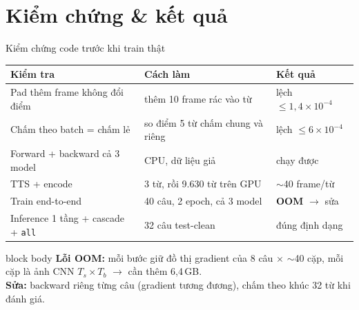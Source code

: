 \documentclass[aspectratio=169,xcolor=table]{beamer}
\newcommand{\bad}[1]{\textcolor{RiskRed}{\textbf{#1}}}
\newcommand{\cmark}{\textcolor{GoodGreen}{\ding{51}}}
\begin{document}
\section{Kiểm chứng \& kết quả}
\begin{frame}{Kiểm chứng code trước khi train thật}
\footnotesize\renewcommand{\arraystretch}{1.25}
\begin{tabular}{@{}p{4.4cm}p{5.0cm}p{3.6cm}@{}}
\toprule
\textbf{Kiểm tra} & \textbf{Cách làm} & \textbf{Kết quả}\\
\midrule
Pad thêm frame không đổi điểm & thêm 10 frame rác vào từ & lệch $\le 1{,}4\times10^{-4}$ \cmark\\
Chấm theo batch = chấm lẻ & so điểm 5 từ chấm chung và riêng & lệch $\le 6\times10^{-4}$ \cmark\\
Forward + backward cả 3 model & CPU, dữ liệu giả & chạy được \cmark\\
TTS + encode & 3 từ, rồi 9.630 từ trên GPU & $\sim$40 frame/từ \cmark\\
Train end-to-end & 40 câu, 2 epoch, cả 3 model & \bad{OOM} $\rightarrow$ sửa \cmark\\
Inference 1 tầng + cascade + \texttt{all} & 32 câu test-clean & đúng định dạng \cmark\\
\bottomrule
\end{tabular}
\vspace{0.3cm}
\begin{beamercolorbox}[sep=0.5em,rounded=true]{block body}
\footnotesize\textbf{Lỗi OOM:} mỗi bước giữ đồ thị gradient của 8 câu $\times$ $\sim$40 cặp, mỗi cặp là ảnh CNN $T_s\times T_b$ $\rightarrow$ cần thêm 6,4\,GB.\\
\textbf{Sửa:} backward riêng từng câu (gradient tương đương), chấm theo khúc 32 từ khi đánh giá.
\end{beamercolorbox}
\end{frame}
\end{document}
